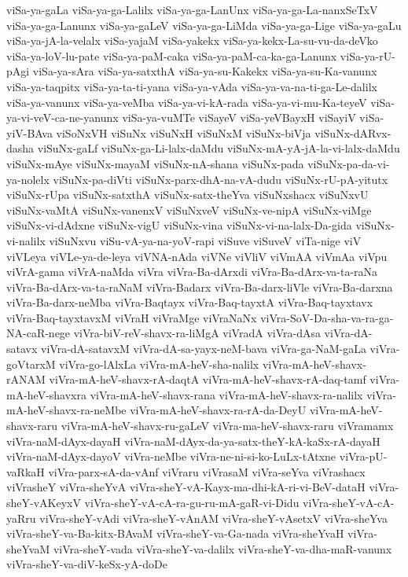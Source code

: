 {viSa-ya-gaLa
viSa-ya-ga-Lalilx
viSa-ya-ga-LanUnx
viSa-ya-ga-La-nanxSeTxV
viSa-ya-ga-Lanunx
viSa-ya-gaLeV
viSa-ya-ga-LiMda
viSa-ya-ga-Lige
viSa-ya-gaLu
viSa-ya-jA-la-velalx
viSa-yajaM
viSa-yakekx
viSa-ya-kekx-La-su-vu-da-deVko
viSa-ya-loV-lu-pate
viSa-ya-paM-caka
viSa-ya-paM-ca-ka-ga-Lanunx
viSa-ya-rU-pAgi
viSa-ya-sAra
viSa-ya-satxthA
viSa-ya-su-Kakekx
viSa-ya-su-Ka-vanunx
viSa-ya-taqpitx
viSa-ya-ta-ti-yana
viSa-ya-vAda
viSa-ya-va-na-ti-ga-Le-dalilx
viSa-ya-vanunx
viSa-ya-veMba
viSa-ya-vi-kA-rada
viSa-ya-vi-mu-Ka-teyeV
viSa-ya-vi-veV-ca-ne-yanunx
viSa-ya-vuMTe
viSayeV
viSa-yeVBayxH
viSayiV
viSa-yiV-BAva
viSoNxVH
viSuNx
viSuNxH
viSuNxM
viSuNx-biVja
viSuNx-dARvx-dasha
viSuNx-gaLf
viSuNx-ga-Li-lalx-daMdu
viSuNx-mA-yA-jA-la-vi-lalx-daMdu
viSuNx-mAye
viSuNx-mayaM
viSuNx-nA-shana
viSuNx-pada
viSuNx-pa-da-vi-ya-nolelx
viSuNx-pa-diVti
viSuNx-parx-dhA-na-vA-dudu
viSuNx-rU-pA-yitutx
viSuNx-rUpa
viSuNx-satxthA
viSuNx-satx-theYva
viSuNxshacx
viSuNxvU
viSuNx-vaMtA
viSuNx-vanenxV
viSuNxveV
viSuNx-ve-nipA
viSuNx-viMge
viSuNx-vi-dAdxne
viSuNx-vigU
viSuNx-vina
viSuNx-vi-na-lalx-Da-gida
viSuNx-vi-nalilx
viSuNxvu
viSu-vA-ya-na-yoV-rapi
viSuve
viSuveV
viTa-nige
viV
viVLeya
viVLe-ya-de-leya
viVNA-nAda
viVNe
viVliV
viVmAA
viVmAa
viVpu
viVrA-gama
viVrA-naMda
viVra
viVra-Ba-dArxdi
viVra-Ba-dArx-va-ta-raNa
viVra-Ba-dArx-va-ta-raNaM
viVra-Badarx
viVra-Ba-darx-liVle
viVra-Ba-darxna
viVra-Ba-darx-neMba
viVra-Baqtayx
viVra-Baq-tayxtA
viVra-Baq-tayxtavx
viVra-Baq-tayxtavxM
viVraH
viVraMge
viVraNaNx
viVra-SoV-Da-sha-va-ra-ga-NA-caR-nege
viVra-biV-reV-shavx-ra-liMgA
viVradA
viVra-dAsa
viVra-dA-satavx
viVra-dA-satavxM
viVra-dA-sa-yayx-neM-bava
viVra-ga-NaM-gaLa
viVra-goVtarxM
viVra-go-lAlxLa
viVra-mA-heV-sha-nalilx
viVra-mA-heV-shavx-rANAM
viVra-mA-heV-shavx-rA-daqtA
viVra-mA-heV-shavx-rA-daq-tamf
viVra-mA-heV-shavxra
viVra-mA-heV-shavx-rana
viVra-mA-heV-shavx-ra-nalilx
viVra-mA-heV-shavx-ra-neMbe
viVra-mA-heV-shavx-ra-rA-da-DeyU
viVra-mA-heV-shavx-raru
viVra-mA-heV-shavx-ru-gaLeV
viVra-ma-heV-shavx-raru
viVramamx
viVra-naM-dAyx-dayaH
viVra-naM-dAyx-da-ya-satx-theY-kA-kaSx-rA-dayaH
viVra-naM-dAyx-dayoV
viVra-neMbe
viVra-ne-ni-si-ko-LuLx-tAtxne
viVra-pU-vaRkaH
viVra-parx-sA-da-vAnf
viVraru
viVrasaM
viVra-seYva
viVrashacx
viVrasheY
viVra-sheYvA
viVra-sheY-vA-Kayx-ma-dhi-kA-ri-vi-BeV-dataH
viVra-sheY-vAKeyxV
viVra-sheY-vA-cA-ra-gu-ru-mA-gaR-vi-Didu
viVra-sheY-vA-cA-yaRru
viVra-sheY-vAdi
viVra-sheY-vAnAM
viVra-sheY-vAsetxV
viVra-sheYva
viVra-sheY-va-Ba-kitx-BAvaM
viVra-sheY-va-Ga-nada
viVra-sheYvaH
viVra-sheYvaM
viVra-sheY-vada
viVra-sheY-va-dalilx
viVra-sheY-va-dha-maR-vanunx
viVra-sheY-va-diV-keSx-yA-doDe
}
